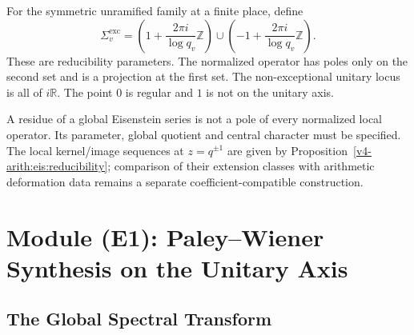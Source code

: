 \begin{definition}
\label{v4-arith:w6-d:def:exceptional}
For the symmetric unramified family at a finite place, define
\begin{equation}
\label{v4-arith:w6-d:eq:exceptional}
 \Sigma_v^{\mathrm{exc}}=
 \left(1+\frac{2\pi i}{\log q_v}\mathbb Z\right)
 \cup\left(-1+\frac{2\pi i}{\log q_v}\mathbb Z\right).
\end{equation}
These are reducibility parameters. The normalized operator has poles
only on the second set and is a projection at the first set. The
non-exceptional unitary locus is all of $i\mathbb R$. The point $0$
is regular and $1$ is not on the unitary axis.
\end{definition}
\begin{remark}
\label{v4-arith:w6-d:rem:exceptional-form}
A residue of a global Eisenstein series is not a pole of every normalized
local operator. Its parameter, global quotient and central character
must be specified. The local kernel/image sequences at $z=q^{\pm1}$
are given by Proposition~\ref{v4-arith:eis:reducibility}; comparison of
their extension classes with arithmetic deformation data remains a
separate coefficient-compatible construction.
\end{remark}

\section{Module (E1): Paley--Wiener Synthesis on the Unitary Axis}
\label{v4-arith:w6-d:E1}

\subsection{The Global Spectral Transform}

